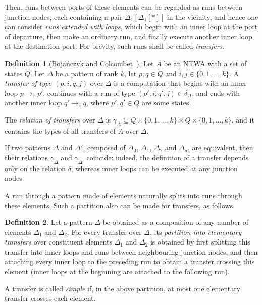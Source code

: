 \documentclass[12pt,a4paper]{article}
\theoremstyle{definition}
\newtheorem{definition}{Definition}
\renewcommand{\epsilon}{\varepsilon}
\begin{document}
Then, runs between ports of these elements
can be regarded as runs between junction nodes,
each containing a pair $\Delta_1[\Delta_1[*]]$ in the vicinity,
and hence one can consider \emph{runs extended with loops},
which begin with an inner loop at the port of departure,
then make an ordinary run,
and finally execute another inner loop at the destination port.
For brevity, such runs shall be called \emph{transfers}.

\begin{definition}[Boja\'nczyk and Colcombet~{\cite[Defn.~5]{BojanczykColcombet_reg}}]
Let $A$ be an NTWA with a set of states $Q$.
Let $\Delta$ be a pattern of rank $k$,
let $p,q \in Q$ and $i,j \in \{0, 1, \ldots, k\}$.
A \emph{transfer of type $(p,i,q,j)$} over $\Delta$
is a computation that begins with an inner loop $p \to_{\epsilon}p'$,
continues with a run of type $(p',i,q',j) \in \delta_{\Delta}$,
and ends with another inner loop $q' \to_{\epsilon} q$,
where $p', q' \in Q$ are some states.

The \emph{relation of transfers} over $\Delta$
is $\gamma_{\Delta} \subseteq Q \times \{0, 1, \ldots, k\} \times Q \times \{0, 1, \ldots, k\}$,
and it contains the types of all transfers of $A$ over $\Delta$.
\end{definition}

If two patterns $\Delta$ and $\Delta'$,
composed of $\Delta_0$, $\Delta_1$, $\Delta_2$ and $\Delta_a$, are equivalent,
then their relations $\gamma_{\Delta}$ and $\gamma_{\Delta'}$ coincide:
indeed, the definition of a transfer depends only on the relation $\delta$,
whereas inner loops can be executed at any junction nodes.

A run through a pattern made of elements
naturally splits into runs through these elements.
Such a partition also can be made for transfers, as follows. 
\begin{definition}
Let a pattern $\Delta$ be obtained as a composition
of any number of elements $\Delta_1$ and $\Delta_2$.
For every transfer over $\Delta$,
its \emph{partition into elementary transfers}
over constituent elements $\Delta_1$ and $\Delta_2$
is obtained by first splitting this transfer
into inner loops and runs between neighbouring junction nodes,
and then attaching every inner loop to the preceding run
to obtain a transfer crossing this element
(inner loops at the beginning are attached to the following run).

A transfer is called \emph{simple}
if, in the above partition,
at most one elementary transfer crosses each element.
\end{definition}
\end{document}
